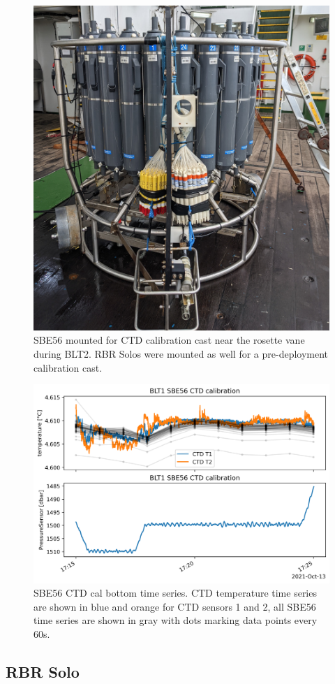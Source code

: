 \documentclass[10pt,letterpaper]{article}
\begin{document}
\begin{figure}[htpb]
    \centering
    \includegraphics[width=0.6\linewidth]{fig/blt2_sbe56_solo_calibration.jpg}
    \caption{SBE56 mounted for CTD calibration cast near the rosette vane during BLT2. RBR Solos were mounted as well for a pre-deployment calibration cast.}
    \label{fig:sbe56_ctd_cal_photo}
\end{figure}

\begin{figure}[htpb]
    \centering
    \includegraphics[width=0.7\linewidth]{fig/blt1_sbe56_ctd_cal_bottom.png}
    \caption{SBE56 CTD cal bottom time series. CTD temperature time series are shown in blue and orange for CTD sensors 1 and 2, all SBE56 time series are shown in gray with dots marking data points every 60s.}
    \label{fig:sbe56_ctd_cal}
\end{figure}



\subsection*{RBR Solo}
\label{sec:rbr_solo}
\end{document}
